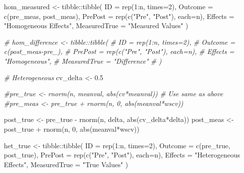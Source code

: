 \documentclass[
]{article}
\newenvironment{Shaded}{\begin{snugshade}}{\end{snugshade}}
\newcommand{\AttributeTok}[1]{\textcolor[rgb]{0.77,0.63,0.00}{#1}}
\newcommand{\CommentTok}[1]{\textcolor[rgb]{0.56,0.35,0.01}{\textit{#1}}}
\newcommand{\DecValTok}[1]{\textcolor[rgb]{0.00,0.00,0.81}{#1}}
\newcommand{\FloatTok}[1]{\textcolor[rgb]{0.00,0.00,0.81}{#1}}
\newcommand{\FunctionTok}[1]{\textcolor[rgb]{0.00,0.00,0.00}{#1}}
\newcommand{\NormalTok}[1]{#1}
\newcommand{\OtherTok}[1]{\textcolor[rgb]{0.56,0.35,0.01}{#1}}
\newcommand{\SpecialCharTok}[1]{\textcolor[rgb]{0.00,0.00,0.00}{#1}}
\newcommand{\StringTok}[1]{\textcolor[rgb]{0.31,0.60,0.02}{#1}}
\begin{document}
\begin{Shaded}
\begin{Highlighting}[]
\NormalTok{hom\_measured }\OtherTok{\textless{}{-}}\NormalTok{ tibble}\SpecialCharTok{::}\FunctionTok{tibble}\NormalTok{(}
  \AttributeTok{ID =} \FunctionTok{rep}\NormalTok{(}\DecValTok{1}\SpecialCharTok{:}\NormalTok{n, }\AttributeTok{times=}\DecValTok{2}\NormalTok{),}
  \AttributeTok{Outcome =} \FunctionTok{c}\NormalTok{(pre\_meas, post\_meas),}
  \AttributeTok{PrePost =} \FunctionTok{rep}\NormalTok{(}\FunctionTok{c}\NormalTok{(}\StringTok{"Pre"}\NormalTok{, }\StringTok{"Post"}\NormalTok{), }\AttributeTok{each=}\NormalTok{n),}
  \AttributeTok{Effects =} \StringTok{"Homogeneous Effects"}\NormalTok{,}
  \AttributeTok{MeasuredTrue =} \StringTok{"Measured Values"}
\NormalTok{)}

\CommentTok{\# hom\_difference \textless{}{-} tibble::tibble(}
\CommentTok{\#   ID = rep(1:n, times=2),}
\CommentTok{\#   Outcome = c(post\_meas{-}pre\_),}
\CommentTok{\#   PrePost = rep(c("Pre", "Post"), each=n),}
\CommentTok{\#   Effects = "Homogeneous",}
\CommentTok{\#   MeasuredTrue = "Difference"}
\CommentTok{\# )}


\CommentTok{\# Heterogeneous}
\NormalTok{cv\_delta }\OtherTok{\textless{}{-}} \FloatTok{0.5}

\CommentTok{\#pre\_true \textless{}{-} rnorm(n, meanval, abs(cv*meanval)) \# Use same as above}
\CommentTok{\#pre\_meas \textless{}{-} pre\_true + rnorm(n, 0, abs(meanval*wscv))}

\NormalTok{post\_true }\OtherTok{\textless{}{-}}\NormalTok{ pre\_true }\SpecialCharTok{{-}} \FunctionTok{rnorm}\NormalTok{(n, delta, }\FunctionTok{abs}\NormalTok{(cv\_delta}\SpecialCharTok{*}\NormalTok{delta))}
\NormalTok{post\_meas }\OtherTok{\textless{}{-}}\NormalTok{ post\_true }\SpecialCharTok{+} \FunctionTok{rnorm}\NormalTok{(n, }\DecValTok{0}\NormalTok{, }\FunctionTok{abs}\NormalTok{(meanval}\SpecialCharTok{*}\NormalTok{wscv))}

\NormalTok{het\_true }\OtherTok{\textless{}{-}}\NormalTok{ tibble}\SpecialCharTok{::}\FunctionTok{tibble}\NormalTok{(}
  \AttributeTok{ID =} \FunctionTok{rep}\NormalTok{(}\DecValTok{1}\SpecialCharTok{:}\NormalTok{n, }\AttributeTok{times=}\DecValTok{2}\NormalTok{),}
  \AttributeTok{Outcome =} \FunctionTok{c}\NormalTok{(pre\_true, post\_true),}
  \AttributeTok{PrePost =} \FunctionTok{rep}\NormalTok{(}\FunctionTok{c}\NormalTok{(}\StringTok{"Pre"}\NormalTok{, }\StringTok{"Post"}\NormalTok{), }\AttributeTok{each=}\NormalTok{n),}
  \AttributeTok{Effects =} \StringTok{"Heterogeneous Effects"}\NormalTok{,}
  \AttributeTok{MeasuredTrue =} \StringTok{"True Values"}
\NormalTok{)}


\end{Highlighting}
\end{Shaded}
\end{document}
